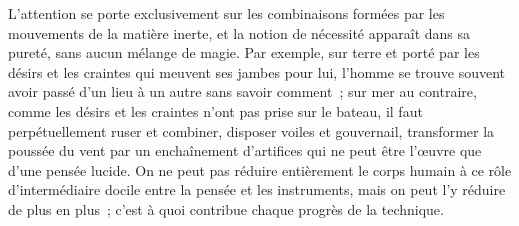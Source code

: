 \documentclass[french,twoside]{book} %
\begin{document}
L'attention se porte exclusivement sur les combinaisons formées par les mouvements de la matière inerte, et la notion de nécessité apparaît dans sa pureté, sans aucun mélange de magie. Par exemple, sur terre et porté par les désirs et les craintes qui meuvent ses jambes pour lui, l'homme se trouve souvent avoir passé d'un lieu à un autre sans savoir comment ; sur mer au contraire, comme les désirs et les craintes n'ont pas prise sur le bateau, il faut perpétuellement ruser et combiner, disposer voiles et gouvernail, transformer la poussée du vent par un enchaînement d'artifices qui ne peut être l'œuvre que d'une pensée lucide. On ne peut pas réduire entièrement le corps humain à ce rôle d'intermédiaire docile entre la pensée et les instruments, mais on peut l'y réduire de plus en plus ; c'est à quoi contribue chaque progrès de la technique.\par
\end{document}
